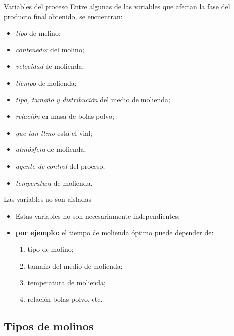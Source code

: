 \documentclass[%
spanish,
progressbar=head,
subsectionpage,
aspectratio=169
]{beamer}
\begin{document}
\begin{frame}{Variables del proceso}
    Entre algunas de las variables que afectan la fase del producto final obtenido, se encuentran:

    \begin{itemize}[<+-| alert@+>]
        \item \emph{tipo} de molino;
        \item \emph{contenedor} del molino;
        \item \emph{velocidad} de molienda;
        \item \emph{tiempo} de molienda;
        \item \emph{tipo, tamaño y distribución} del medio de molienda;
        \item \emph{relación} en masa de bolas-polvo;
        \item \emph{que tan lleno} está el vial;
        \item \emph{atmósfera} de molienda;
        \item \emph{agente de control} del proceso;
        \item \emph{temperatura} de molienda.
    \end{itemize}
\end{frame}

\begin{frame}{Las variables no son aisladas}
\begin{itemize}[<+-| alert@+>]
    \item Estas variables no son necesariamente independientes;\\
    \item[] \textbf{por ejemplo:} el tiempo de molienda óptimo puede depender de: 
    \begin{enumerate}
        \item tipo de molino;
        \item tamaño del medio de molienda;
        \item temperatura de molienda;
        \item relación bolas-polvo, etc.
    \end{enumerate}
\end{itemize}
\end{frame}

\subsection{Tipos de molinos}
\end{document}
